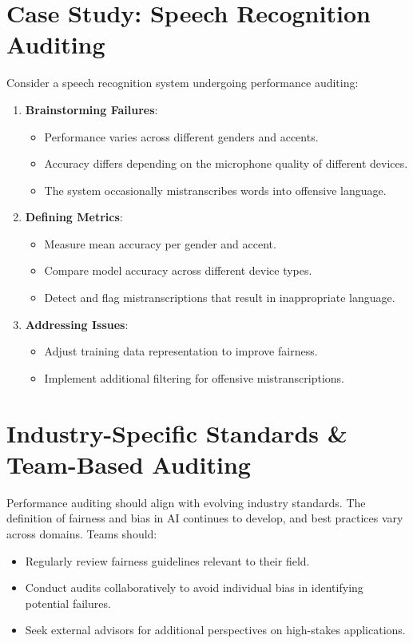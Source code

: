 \documentclass[12pt,openany]{book}
\begin{document}
\section{Case Study: Speech Recognition Auditing}
Consider a speech recognition system undergoing performance auditing:
\begin{enumerate}
    \item \textbf{Brainstorming Failures}:
    \begin{itemize}
        \item Performance varies across different genders and accents.
        \item Accuracy differs depending on the microphone quality of different devices.
        \item The system occasionally mistranscribes words into offensive language.
    \end{itemize}
    \item \textbf{Defining Metrics}:
    \begin{itemize}
        \item Measure mean accuracy per gender and accent.
        \item Compare model accuracy across different device types.
        \item Detect and flag mistranscriptions that result in inappropriate language.
    \end{itemize}
    \item \textbf{Addressing Issues}:
    \begin{itemize}
        \item Adjust training data representation to improve fairness.
        \item Implement additional filtering for offensive mistranscriptions.
    \end{itemize}
\end{enumerate}

\section{Industry-Specific Standards \& Team-Based Auditing}
Performance auditing should align with evolving industry standards. The definition of fairness and bias in AI continues to develop, and best practices vary across domains. Teams should:
\begin{itemize}
    \item Regularly review fairness guidelines relevant to their field.
    \item Conduct audits collaboratively to avoid individual bias in identifying potential failures.
    \item Seek external advisors for additional perspectives on high-stakes applications.
\end{itemize}
\end{document}
